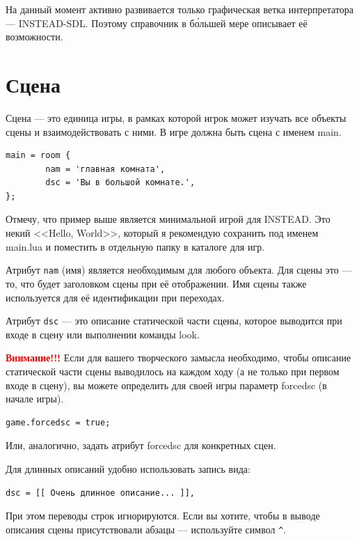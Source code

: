 \documentclass[a4paper,12pt]{article}
\begin{document}
На данный момент активно развивается только графическая ветка интерпретатора --- INSTEAD-SDL. Поэтому справочник в б\'{о}льшей мере описывает её возможности.

\section{Сцена}

Сцена --- это единица игры, в рамках которой игрок может изучать все объекты сцены и взаимодействовать с ними. В игре должна быть сцена с именем main.

\begin{verbatim}
main = room {
        nam = 'главная комната',
        dsc = 'Вы в большой комнате.',
};
\end{verbatim}

Отмечу, что пример выше является минимальной игрой для INSTEAD. Это некий <<Hello, World>>, который я рекомендую сохранить под именем main.lua и поместить в отдельную папку в каталоге для игр.


Атрибут \verb/nam/ (имя) является необходимым для любого объекта. Для сцены это --- то, что будет заголовком сцены при её отображении. Имя сцены также используется для её идентификации при переходах.

Атрибут \verb/dsc/ --- это описание статической части сцены, которое выводится при входе в сцену или выполнении команды look.

\textbf{\textcolor{red}{Внимание!!!}} Если для вашего творческого замысла необходимо, чтобы описание статической части сцены выводилось на каждом ходу (а не только при первом входе в сцену), вы можете определить для своей игры параметр forcedsc (в начале игры).

\begin{verbatim}
game.forcedsc = true;
\end{verbatim}

Или, аналогично, задать атрибут forcedsc для конкретных сцен.

\index{[[ ]]}
Для длинных описаний удобно использовать запись вида:

\begin{verbatim}
dsc = [[ Очень длинное описание... ]],
\end{verbatim}

При этом переводы строк игнорируются. Если вы хотите, чтобы в выводе описания сцены присутствовали абзацы --- используйте символ \verb/^/.
\end{document}
